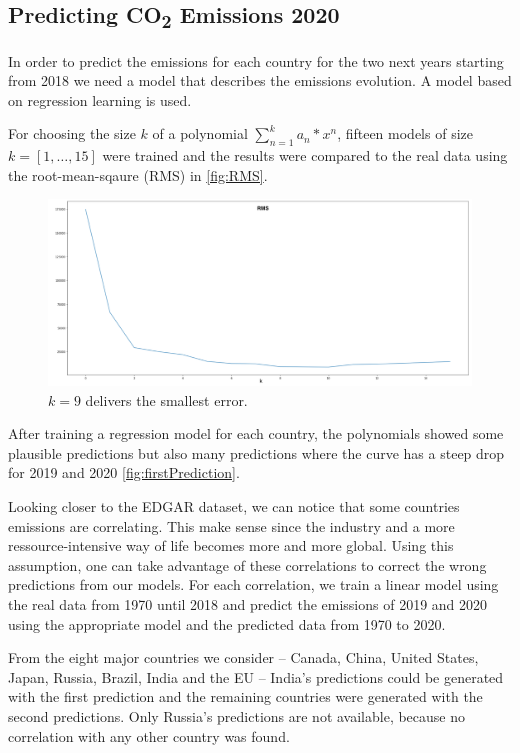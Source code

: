 

\subsection*{Predicting CO\textsubscript{2} Emissions 2020}

In order to predict the emissions for each country for the two next years starting from 2018 we need a model that describes the \co emissions evolution. A model based on regression learning is used.

For choosing the size $k$ of a polynomial $\sum_{n=1}^{k}{a_n*x^n}$, fifteen models of size $k=[1,\dots,15]$ were trained and the results were compared to the real data using the root-mean-sqaure (RMS) in \autoref{fig:RMS}.
\begin{figure}[h!]
	\centering
	\includegraphics[width=0.7\linewidth]{ziedPNGS/RMS}
	\caption{$k=9$ delivers the smallest error.}
	\label{fig:RMS}
\end{figure}%

After training a regression model for each country, the polynomials showed some plausible predictions but also many predictions where the curve has a steep drop for 2019 and 2020 \autoref{fig:firstPrediction}. 

Looking closer to the EDGAR dataset, we can notice that some countries emissions are correlating. This make sense since the industry and a more ressource-intensive way of life becomes more and more global. Using this assumption, one can take advantage of these correlations to correct the wrong predictions from our models.
For each correlation, we train a linear model using the real data from 1970 until 2018 and predict the emissions of 2019 and 2020 using the appropriate model and the predicted data from 1970 to 2020.

From the eight major countries we consider -- Canada, China, United States, Japan, Russia, Brazil, India and the EU -- India's predictions could be generated with the first prediction and the remaining countries were generated with the second predictions.
Only Russia's predictions are not available, because no correlation with any other country was found.

